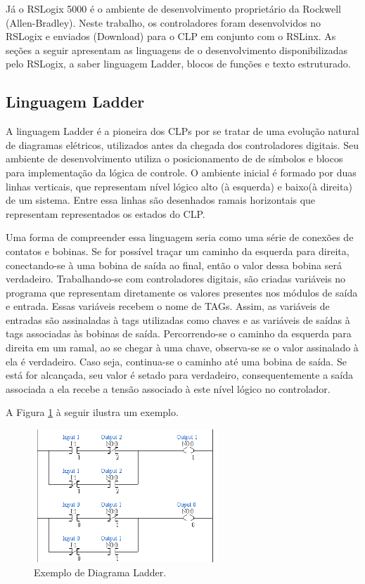 Já o RSLogix 5000 é o ambiente de desenvolvimento proprietário da Rockwell (Allen-Bradley). Neste trabalho, os controladores foram desenvolvidos no RSLogix e enviados (Download) para o CLP em conjunto com o RSLinx. As seções a seguir apresentam as linguagens de o desenvolvimento disponibilizadas pelo RSLogix, a saber linguagem Ladder, blocos de funções e texto estruturado.

\subsection{Linguagem Ladder} \label{subsec:ladder}
A linguagem Ladder é a pioneira dos CLPs por se tratar de uma evolução natural de diagramas elétricos, utilizados antes da chegada dos controladores digitais.  Seu ambiente de desenvolvimento utiliza o posicionamento de de símbolos e blocos para implementação da lógica de controle. 
O ambiente inicial é formado por duas linhas verticais, que representam nível lógico alto (à esquerda) e baixo(à direita) de um sistema. Entre essa linhas são desenhados ramais horizontais que representam representados os estados do CLP.

Uma forma de compreender essa linguagem seria como uma série de conexões de contatos e bobinas. Se for possível traçar um caminho da esquerda para direita, conectando-se à uma bobina de saída ao final, então o valor dessa bobina será verdadeiro. Trabalhando-se com controladores digitais, são criadas variáveis no programa que representam diretamente os valores presentes nos módulos de saída e entrada. Essas variáveis recebem o nome de TAGs. Assim, as variáveis de entradas são assinaladas à tags utilizadas como chaves e as variáveis de saídas à tags associadas às bobinas de saída. Percorrendo-se o caminho da esquerda para direita em um ramal, ao se chegar à uma chave, observa-se se o valor assinalado à ela é verdadeiro. Caso seja, continua-se o caminho até uma bobina de saída. Se está for alcançada, seu valor é setado para verdadeiro, consequentemente a saída associada a ela recebe a tensão associado à este nível lógico no controlador.

A Figura \ref{fig:ladder} à seguir ilustra um exemplo.

\begin{figure}[H]
	\centering
	\includegraphics[height=5cm,keepaspectratio]{figs/ladder.png}
	\caption{Exemplo de Diagrama Ladder.}
	\label{fig:ladder}
\end{figure}

